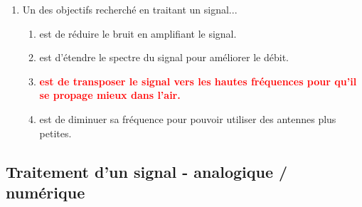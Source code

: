 \documentclass[a4paper]{article}
\begin{document}
\begin{enumerate}[label=Q\arabic*.]
\item Un des objectifs recherché en traitant un signal...
\begin{enumerate}
    \item est de réduire le bruit en amplifiant le signal.
    \item est d'étendre le spectre du signal pour améliorer le débit.
    \item \textcolor{red}{\textbf{est de transposer le signal vers les hautes fréquences pour qu'il se propage mieux dans l'air.}}
    \item est de diminuer sa fréquence pour pouvoir utiliser des antennes plus petites.
\end{enumerate}


\end{enumerate}










\subsection{Traitement d'un signal - analogique / numérique}
\end{document}
